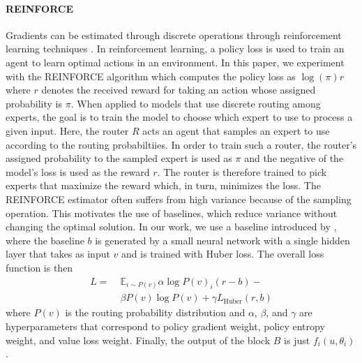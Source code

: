 \documentclass{article}
\theoremstyle{plain}
\theoremstyle{definition}
\theoremstyle{remark}
\begin{document}
\paragraph{REINFORCE}
Gradients can be estimated through discrete operations through reinforcement learning techniques \citep{schulman2015gradient, bengio2013estimating}.
In reinforcement learning, a policy loss is used to train an agent to learn optimal actions in an environment. 
In this paper, we experiment with the REINFORCE algorithm which computes the policy loss as $\log(\pi) r$ where $r$ denotes the received reward for taking an action whose assigned probability is $\pi$.
When applied to models that use discrete routing among experts, the goal is to train the model to choose which expert to use to process a given input. 
Here, the router $R$ acts an agent that samples an expert to use according to the routing probabiltiies.
In order to train such a router, the router's assigned probability to the sampled expert is used as $\pi$ and the negative of the model's loss is used as the reward $r$.
The router is therefore trained to pick experts that maximize the reward which, in turn, minimizes the loss.
The REINFORCE estimator often suffers from high variance because of the sampling operation. 
This motivates the use of baselines, which reduce variance without changing the optimal solution.
In our work, we use a baseline introduced by \citet{clark2022unified}, where the baseline $b$ is generated by a small neural network with a single hidden layer that takes as input $v$ and is trained with Huber loss.
The overall loss function is then
\begin{align}
\label{eq:reinforce_estimator_eq}
    L = \;&\mathbb{E}_{i \sim P(v)} \alpha \log P(v)_i (r - b) - \\
    &\beta P(v) \log P(v) + \gamma L_{\text{Huber}}(r,b)
\end{align}
where $P(v)$ is the routing probability distribution and $\alpha$, $\beta$, and $\gamma$ are hyperparameters that correspond to policy gradient weight, policy entropy weight, and value loss weight. 
Finally, the output of the block $B$ is just $f_i(u, \theta_i)$.
\end{document}
